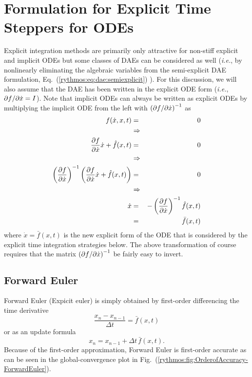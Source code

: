 
\section{Formulation for Explicit Time Steppers for ODEs}

Explicit integration methods are primarily only attractive for non-stiff
explicit and implicit ODEs but some classes of DAEs can be considered
as well (\emph{i.e.}, by nonlinearly eliminating the algebraic variables
from the semi-explicit DAE formulation, Eq.~(\ref{rythmos:eq:dae:semiexplicit})
\cite{BCP}). For this discussion, we will also assume that the DAE
has been written in the explicit ODE form (\emph{i.e.}, $\partial f / \partial \dot{x}=I$).
Note that implicit ODEs can always be written as explicit ODEs by
multiplying the implicit ODE from the left with $\left(\partial f / \partial \dot{x}\right)^{-1}$
as
\begin{eqnarray*}
f(\dot{x},x,t) & = & 0\\
 & \Rightarrow\\
\displaystyle{\frac{\partial f}{\partial \dot{x}}}\dot{x}+\hat{f}(x,t) & = & 0\\
 & \Rightarrow\\
\left(\displaystyle{\frac{\partial f}{\partial \dot{x}}}\right)^{-1}\left(\displaystyle{\frac{\partial f}{\partial \dot{x}}}\dot{x}+\hat{f}(x,t)\right) & = & 0\\
 & \Rightarrow\\
\dot{x} & = & -\left(\displaystyle{\frac{\partial f}{\partial \dot{x}}}\right)^{-1}\hat{f}(x,t)\\
 & = & \bar{f}(x,t)
\end{eqnarray*}
where $\dot{x}=\bar{f}(x,t)$ is the new explicit form of the ODE
that is considered by the explicit time integration strategies below.
The above transformation of course requires that the matrix $\left(\partial f / \partial \dot{x}\right)^{-1}$
be fairly easy to invert.


\subsection{Forward Euler\label{rythmos:sec:Forward-Euler}}

Forward Euler (Expicit euler) is simply obtained by first-order differencing
the time derivative
\[
\frac{x_{n}-x_{n-1}}{\Delta t}=\bar{f}(x,t)
\]
or as an update formula
\[
x_{n}=x_{n-1}+\Delta t\,\bar{f}(x,t).
\]
Because of the first-order approximation, Forward Euler is first-order
accurate as can be seen in the global-convergence plot in Fig.~(\ref{rythmos:fig:OrderofAccuracy-ForwardEuler}).

